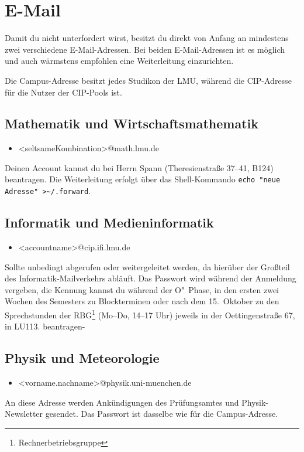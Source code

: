 \section{E-Mail}
Damit du nicht unterfordert wirst, besitzt du direkt von Anfang an mindestens zwei verschiedene E-Mail-Adressen. Bei beiden E-Mail-Adressen ist es möglich und auch wärmstens empfohlen eine Weiterleitung einzurichten.

Die Campus-Adresse besitzt jedes Studikon der LMU, während die CIP-Adresse für die Nutzer der CIP-Pools ist.


\subsection*{Mathematik und Wirtschaftsmathematik\subjectList{\subjectM\subjectW}}
\begin{itemize}
	\item[]<seltsameKombination>@math.lmu.de
\end{itemize}
Deinen Account kannst du bei Herrn Spann (Theresienstraße 37--41, B124) beantragen. Die Weiterleitung erfolgt über das Shell-Kommando \verb|echo "neue Adresse" >~/.forward|. 

\subsection*{Informatik und Medieninformatik \subjectList{\subjectI\subjectMI}}
\begin{itemize}
	\item[]<accountname>@cip.ifi.lmu.de
\end{itemize}
Sollte unbedingt abgerufen oder weitergeleitet werden, da hierüber der Großteil des Informatik-Mailverkehrs abläuft. Das Passwort wird während der Anmeldung vergeben, die Kennung kannst du während der O"~Phase, in den ersten zwei Wochen des Semesters zu Blockterminen oder nach dem 15.\ Oktober zu den Sprechstunden der RBG\footnote{Rechnerbetriebsgruppe} 
(Mo--Do, 14--17 Uhr) jeweils in der Oettingenstraße 67, in LU113. beantragen-

\begin{urlList}
\end{urlList}

\subsection*{Physik und Meteorologie\subjectList{\subjectP}}
\begin{itemize}
	\item[]<vorname.nachname>@physik.uni-muenchen.de
\end{itemize}
An diese Adresse werden Ankündigungen des Prüfungsamtes und Physik-Newsletter gesendet.
Das Passwort ist dasselbe wie für die Campus-Adresse.

